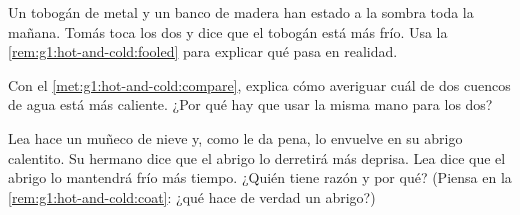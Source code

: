 \begin{exercise}[$\star$]\label{exo:g1:hot-and-cold:7}
Un tobogán de metal y un banco de madera han estado a la sombra toda
la mañana. Tomás toca los dos y dice que el tobogán está más frío. Usa
la \cref{rem:g1:hot-and-cold:fooled} para explicar qué pasa en
realidad.
\end{exercise}

\begin{exercise}[$\star$]\label{exo:g1:hot-and-cold:8}
Con el \cref{met:g1:hot-and-cold:compare}, explica cómo averiguar cuál
de dos cuencos de agua está más caliente. ¿Por qué hay que usar la
misma mano para los dos?
\end{exercise}

\begin{exercise}[$\star\star$]\label{exo:g1:hot-and-cold:9}
Lea hace un muñeco de nieve y, como le da pena, lo envuelve en su
abrigo calentito. Su hermano dice que el abrigo lo derretirá más
deprisa. Lea dice que el abrigo lo mantendrá frío más tiempo. ¿Quién
tiene razón y por qué? (Piensa en la
\cref{rem:g1:hot-and-cold:coat}: ¿qué hace de verdad un abrigo?)
\end{exercise}

